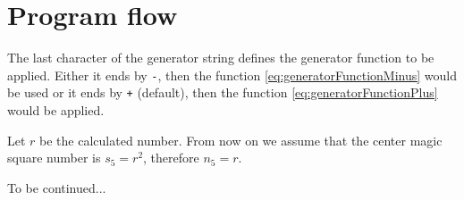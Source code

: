 \documentclass[reqno,10pt,a4paper]{article}
\begin{document}
	
	\section{Program flow}
	
	The last character of the generator string defines the generator function to be applied. Either it ends by \verb§-§, then the function \eqref{eq:generatorFunctionMinus} would be used or it ends by \verb§+§ (default), then the function \eqref{eq:generatorFunctionPlus} would be applied.
	
	Let $r$ be the calculated number. From now on we assume that the center magic square number is $s_5 = r^2$, therefore $n_5 = r$.
	
	To be continued...
	
	
	
	
\end{document}
